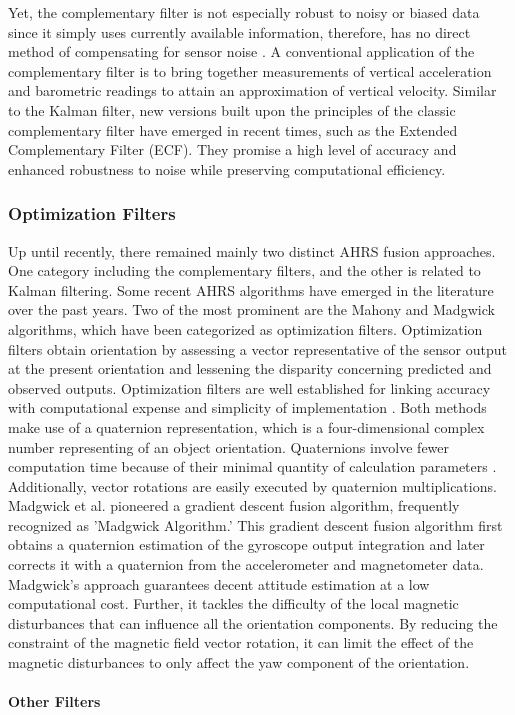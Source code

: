 Yet, the complementary filter is not especially robust to noisy or biased data since it simply uses currently available information, therefore, has no direct method of compensating for sensor noise \cite{wilson2019formulation}. A conventional application of the complementary filter is to bring together measurements of vertical acceleration and barometric readings to attain an approximation of vertical velocity. Similar to the Kalman filter, new versions built upon the principles of the classic complementary filter have emerged in recent times, such as the Extended Complementary Filter (ECF). They promise a high level of accuracy and enhanced robustness to noise while preserving computational efficiency.

\subsubsection{Optimization Filters}

Up until recently, there remained mainly two distinct AHRS fusion approaches. One category including the complementary filters, and the other is related to Kalman filtering. Some recent AHRS algorithms have emerged in the literature over the past years. Two of the most prominent are the Mahony and Madgwick algorithms, which have been categorized as optimization filters. Optimization filters obtain orientation by assessing a vector representative of the sensor output at the present orientation and lessening the disparity concerning predicted and observed outputs. Optimization filters are well established for linking accuracy with computational expense and simplicity of implementation \cite{madgwick2020extended}.
Both methods make use of a quaternion representation, which is a four-dimensional complex number representing of an object orientation. Quaternions involve fewer computation time because of their minimal quantity of calculation parameters \cite{ludwig2018comparison}. Additionally, vector rotations are easily executed by quaternion multiplications.
Madgwick et al. \cite{madgwick2010efficient} pioneered a gradient descent fusion algorithm, frequently recognized as 'Madgwick Algorithm.' This gradient descent fusion algorithm first obtains a quaternion estimation of the gyroscope output integration and later corrects it with a quaternion from the accelerometer and magnetometer data. Madgwick's approach guarantees decent attitude estimation at a low computational cost. Further, it tackles the difficulty of the local magnetic disturbances that can influence all the orientation components. By reducing the constraint of the magnetic field vector rotation, it can limit the effect of the magnetic disturbances to only affect the yaw component of the orientation.

\paragraph{Other Filters}
